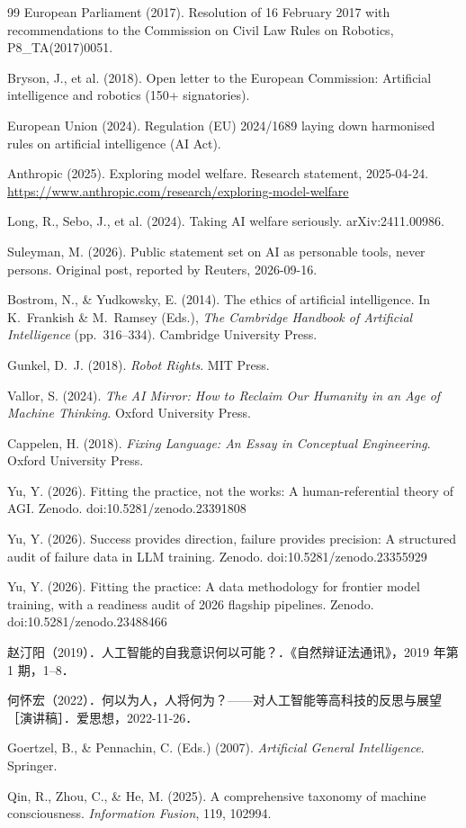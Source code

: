 \documentclass[10pt,fontset=fandol]{ctexart}
\begin{document}
\begin{thebibliography}{99}
European Parliament (2017).
Resolution of 16 February 2017 with recommendations to the Commission on Civil Law Rules on Robotics, P8\_TA(2017)0051.

Bryson, J., et al. (2018).
Open letter to the European Commission: Artificial intelligence and robotics (150+ signatories).

European Union (2024).
Regulation (EU) 2024/1689 laying down harmonised rules on artificial intelligence (AI Act).

Anthropic (2025).
Exploring model welfare.
Research statement, 2025-04-24.
\url{https://www.anthropic.com/research/exploring-model-welfare}

Long, R., Sebo, J., et al. (2024).
Taking AI welfare seriously.
arXiv:2411.00986.

Suleyman, M. (2026).
Public statement set on AI as personable tools, never persons.
Original post, reported by Reuters, 2026-09-16.

Bostrom, N., \& Yudkowsky, E. (2014).
The ethics of artificial intelligence.
In K.~Frankish \& M.~Ramsey (Eds.), \emph{The Cambridge Handbook of Artificial Intelligence} (pp.\ 316--334). Cambridge University Press.

Gunkel, D.~J. (2018).
\emph{Robot Rights}.
MIT Press.

Vallor, S. (2024).
\emph{The AI Mirror: How to Reclaim Our Humanity in an Age of Machine Thinking}.
Oxford University Press.

Cappelen, H. (2018).
\emph{Fixing Language: An Essay in Conceptual Engineering}.
Oxford University Press.

Yu, Y. (2026).
Fitting the practice, not the works: A human-referential theory of AGI.
Zenodo. doi:10.5281/zenodo.23391808

Yu, Y. (2026).
Success provides direction, failure provides precision: A structured audit of failure data in LLM training.
Zenodo. doi:10.5281/zenodo.23355929

Yu, Y. (2026).
Fitting the practice: A data methodology for frontier model training, with a readiness audit of 2026 flagship pipelines.
Zenodo. doi:10.5281/zenodo.23488466

赵汀阳（2019）．人工智能的自我意识何以可能？．《自然辩证法通讯》，2019 年第 1 期，1--8．

何怀宏（2022）．何以为人，人将何为？——对人工智能等高科技的反思与展望［演讲稿］．爱思想，2022-11-26．

Goertzel, B., \& Pennachin, C. (Eds.) (2007).
\emph{Artificial General Intelligence}.
Springer.

Qin, R., Zhou, C., \& He, M. (2025).
A comprehensive taxonomy of machine consciousness.
\emph{Information Fusion}, 119, 102994.

\end{thebibliography}
\end{document}
